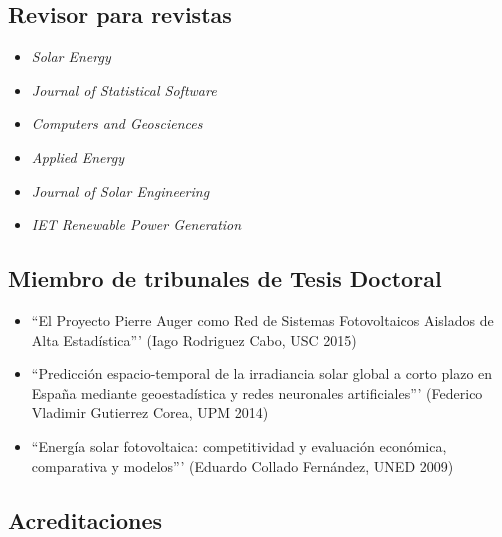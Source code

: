 \documentclass[article, a4paper]{memoir}
\begin{document}
\subsection{Revisor para revistas}
\label{sec-12-1}

\begin{itemize}
\item \emph{Solar Energy}

\item \emph{Journal of Statistical Software}

\item \emph{Computers and Geosciences}

\item \emph{Applied Energy}

\item \emph{Journal of Solar Engineering}

\item \emph{IET Renewable Power Generation}
\end{itemize}

\subsection{Miembro de tribunales de Tesis Doctoral}
\label{sec-12-2}

\begin{itemize}
\item ``El Proyecto Pierre Auger como Red de Sistemas Fotovoltaicos Aislados de Alta Estadística''' (Iago Rodriguez Cabo, USC 2015)

\item ``Predicción espacio-temporal de la irradiancia solar global a corto plazo en España mediante geoestadística y redes neuronales artificiales''' (Federico Vladimir Gutierrez Corea, UPM 2014)

\item ``Energía solar fotovoltaica: competitividad y evaluación económica, comparativa y modelos''' (Eduardo Collado Fernández, UNED 2009)
\end{itemize}

\subsection{Acreditaciones}
\label{sec-12-3}
\end{document}
